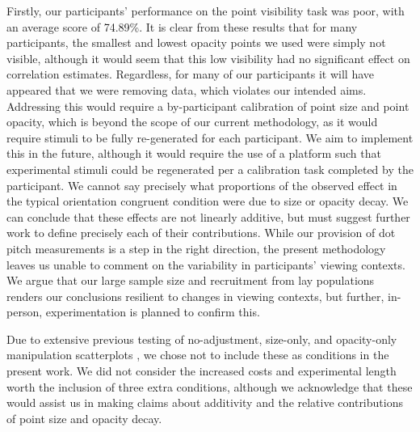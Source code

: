 \documentclass[sigconf]{acmart}
\begin{document}
Firstly, our participants' performance on the point visibility task was
poor, with an average score of 74.89\%. It is clear from these results
that for many participants, the smallest and lowest opacity points we
used were simply not visible, although it would seem that this low
visibility had no significant effect on correlation estimates.
Regardless, for many of our participants it will have appeared that we
were removing data, which violates our intended aims. Addressing this
would require a by-participant calibration of point size and point
opacity, which is beyond the scope of our current methodology, as it
would require stimuli to be fully re-generated for each participant. We
aim to implement this in the future, although it would require the use
of a platform such that experimental stimuli could be regenerated per a
calibration task completed by the participant. We cannot say precisely
what proportions of the observed effect in the typical orientation
congruent condition were due to size or opacity decay. We can conclude
that these effects are not linearly additive, but must suggest further
work to define precisely each of their contributions. While our
provision of dot pitch measurements is a step in the right direction,
the present methodology leaves us unable to comment on the variability
in participants' viewing contexts. We argue that our large sample size
and recruitment from lay populations renders our conclusions resilient
to changes in viewing contexts, but further, in-person, experimentation
is planned to confirm this.

Due to extensive previous testing of no-adjustment, size-only, and
opacity-only manipulation scatterplots
\citep{strain_2023, strain_2023b}, we chose not to include these as
conditions in the present work. We did not consider the increased costs
and experimental length worth the inclusion of three extra conditions,
although we acknowledge that these would assist us in making claims
about additivity and the relative contributions of point size and
opacity decay.
\end{document}
